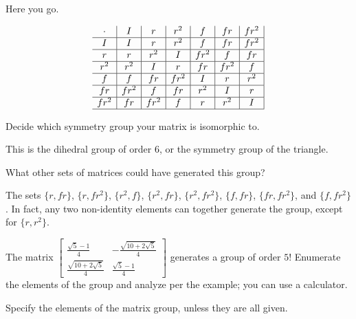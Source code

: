 \documentclass[../key.tex]{subfiles}
\begin{document}
Here you go.

$$\begin{array}{c|c|c|c|c|c|c|}
\cdot & I & r & r^2 & f & fr & fr^2 \\ \hline
I & I & r & r^2 & f & fr & fr^2 \\ \hline
r & r & r^2 & I & fr^2 & f & fr \\ \hline
r^2 & r^2 & I & r & fr & fr^2 & f \\ \hline
f & f & fr & fr^2 & I & r & r^2 \\ \hline
fr & fr^2 & f & fr & r^2 & I & r \\ \hline
fr^2 & fr & fr^2 & f & r & r^2 & I \\ \hline
\end{array}$$

\begin{iinner_problem}
\item Decide which symmetry group your matrix is isomorphic to.
\end{iinner_problem}

This is the dihedral group of order $6$, or the symmetry group of the triangle.

\begin{iinner_problem}
\item What other sets of        matrices could have generated this group?
\end{iinner_problem}

The sets $\{r, fr\}$, $\{r, fr^2\}$, $\{r^2, f\}$, $\{r^2, fr\}$, $\{r^2, fr^2\}$, $\{f,fr\}$, $\{fr,fr^2\}$, and $\{f,fr^2\}$. In fact, any two non-identity elements can together generate the group, except for $\{r, r^2\}$.

\begin{outer_problem}
\item The matrix $\left[\begin{array}{cc} \frac{\sqrt{5}-1}{4} & -\frac{\sqrt{10+2\sqrt{5}}}{4} \\ \frac{\sqrt{10+2\sqrt{5}}}{4} & \frac{\sqrt{5}-1}{4} \end{array}\right]$ generates a group of order $5$! Enumerate the elements of the group and analyze per the example; you can use a calculator.
\end{outer_problem}

\begin{iinner_problem}[start=1]
\item Specify the elements of the matrix group, unless they are all given.
\end{iinner_problem}
\end{document}
